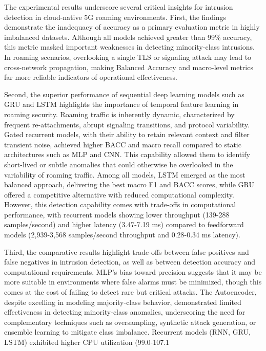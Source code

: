 \documentclass[journal,article,submit,moreauthors,pdftex]{Definitions/tsp}
\begin{document}
The experimental results underscore several critical insights for intrusion detection in cloud-native 5G roaming environments. First, the findings demonstrate the inadequacy of accuracy as a primary evaluation metric in highly imbalanced datasets. Although all models achieved greater than 99\% accuracy, this metric masked important weaknesses in detecting minority-class intrusions. In roaming scenarios, overlooking a single TLS or signaling attack may lead to cross-network propagation, making Balanced Accuracy and macro-level metrics far more reliable indicators of operational effectiveness.

Second, the superior performance of sequential deep learning models such as GRU and LSTM highlights the importance of temporal feature learning in roaming security. Roaming traffic is inherently dynamic, characterized by frequent re-attachments, abrupt signaling transitions, and protocol variability. Gated recurrent models, with their ability to retain relevant context and filter transient noise, achieved higher BACC and macro recall compared to static architectures such as MLP and CNN. This capability allowed them to identify short-lived or subtle anomalies that could otherwise be overlooked in the variability of roaming traffic. Among all models, LSTM emerged as the most balanced approach, delivering the best macro F1 and BACC scores, while GRU offered a competitive alternative with reduced computational complexity. However, this detection capability comes with trade-offs in computational performance, with recurrent models showing lower throughput (139-288 samples/second) and higher latency (3.47-7.19 ms) compared to feedforward models (2,939-3,568 samples/second throughput and 0.28-0.34 ms latency).

Third, the comparative results highlight trade-offs between false positives and false negatives in intrusion detection, as well as between detection accuracy and computational requirements. MLP's bias toward precision suggests that it may be more suitable in environments where false alarms must be minimized, though this comes at the cost of failing to detect rare but critical attacks. The Autoencoder, despite excelling in modeling majority-class behavior, demonstrated limited effectiveness in detecting minority-class anomalies, underscoring the need for complementary techniques such as oversampling, synthetic attack generation, or ensemble learning to mitigate class imbalance. Recurrent models (RNN, GRU, LSTM) exhibited higher CPU utilization (99.0-107.1%
\end{document}
